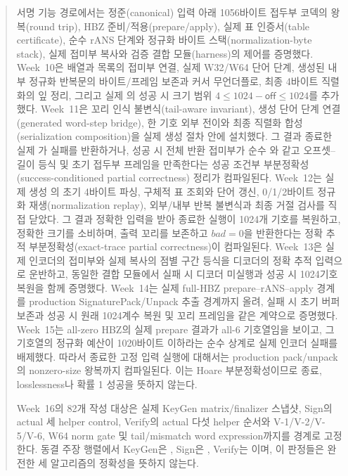\documentclass[11pt,a4paper]{article}
\begin{document}
\begin{abstract}
서명 기능 경로에서는 정준(canonical) 입력 아래 1056바이트 접두부 코덱의
왕복(round trip), HBZ 준비/적용(prepare/apply), 실제 표 인증서(table
certificate), 순수 rANS 단계와 정규화 바이트 스택(normalization-byte stack),
실제 접미부 복사와 검증 결합 모듈(harness)의 제어를 증명했다. Week~10은 배열과
목록의 접미부 연결, 실제 W32/W64 단어 단계, 생성된 내부 정규화 반복문의
바이트/프레임 보존과 커서 무언더플로, 최종 4바이트 직렬화의 잎 정리, 그리고
실제 의 성공 시 크기 범위
\(4\le 1024-\mathsf{off}\le1024\)를 추가했다. Week~11은 꼬리 인식
불변식(tail-aware invariant), 생성 단어 단계 연결(generated word-step bridge),
한 기호 외부 전이와 최종 직렬화 합성(serialization composition)을 실제 생성
절차 안에 설치했다. 그 결과 종료한 실제 가 실패를
반환하거나, 성공 시 전체 반환 접미부가 순수 와 같고
오프셋--길이 등식 및 초기 접두부 프레임을 만족한다는 성공 조건부 부분정확성
(success-conditioned partial correctness) 정리가 컴파일된다. Week~12는 실제
생성 의 초기 4바이트 파싱, 구체적 표 조회와 단어
갱신, 0/1/2바이트 정규화 재생(normalization replay), 외부/내부 반복 불변식과
최종 거절 검사를 직접 닫았다. 그 결과 정확한  입력을
받아 종료한 실행이 1024개 기호를 복원하고, 정확한 크기를 소비하며, 출력 꼬리를
보존하고 \(bad=0\)을 반환한다는 정확 추적 부분정확성(exact-trace partial
correctness)이 컴파일된다. Week~13은 실제 인코더의 접미부와 실제 복사의
점별 구간 등식을 디코더의 정확 추적 입력으로 운반하고, 동일한 결합 모듈에서
실패 시 디코더 미실행과 성공 시 1024기호 복원을 함께 증명했다. Week~14는
실제 full-HBZ prepare--rANS--apply 경계를 production
SignaturePack/Unpack 추출 경계까지 올려, 실패 시 초기 버퍼 보존과 성공 시
원래 1024계수 복원 및 꼬리 프레임을 같은 계약으로 증명했다. Week~15는
all-zero HBZ의 실제 prepare 결과가 all-6 기호열임을 보이고, 그 기호열의
정규화 예산이 1020바이트 이하라는 순수 상계로 실제 인코더 실패를 배제했다.
따라서 종료한 고정 입력 실행에 대해서는 production pack/unpack의 nonzero-size
왕복까지 컴파일된다. 이는 Hoare 부분정확성이므로 종료, losslessness나
확률 1 성공을 뜻하지 않는다.

Week~16의 82개 작성 대상은 실제 KeyGen matrix/finalizer 스냅샷, Sign의 actual
세 helper control, Verify의 actual 다섯 helper 순서와 V-1/V-2/V-5/V-6,
W64 norm gate 및 tail/mismatch word expression까지를
 경계로 고정한다. 동결 주장 행렬에서 KeyGen은
, Sign은 , Verify는
이며, 이 판정들은 완전한 세 알고리즘의
정확성을 뜻하지 않는다.


\end{abstract}
\end{document}

